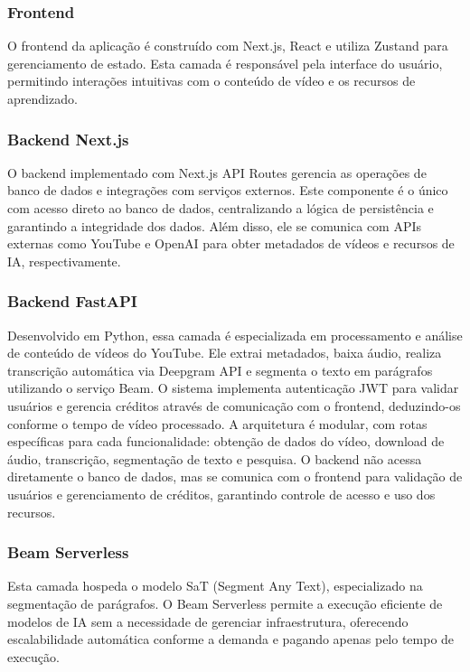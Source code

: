 \documentclass[tcc,capa]{texufpel}
\begin{document}
\subsubsection{Frontend}
O frontend da aplicação é construído com Next.js, React e utiliza Zustand para gerenciamento de estado. Esta camada é responsável pela interface do usuário, permitindo interações intuitivas com o conteúdo de vídeo e os recursos de aprendizado. 

\subsubsection{Backend Next.js}
O backend implementado com Next.js API Routes gerencia as operações de banco de dados e integrações com serviços externos. Este componente é o único com acesso direto ao banco de dados, centralizando a lógica de persistência e garantindo a integridade dos dados. Além disso, ele se comunica com APIs externas como YouTube e OpenAI para obter metadados de vídeos e recursos de IA, respectivamente.

\subsubsection{Backend FastAPI}
Desenvolvido em Python, essa camada é especializada em processamento e análise de conteúdo de vídeos do YouTube. Ele extrai metadados, baixa áudio, realiza transcrição automática via Deepgram API e segmenta o texto em parágrafos utilizando o serviço Beam. O sistema implementa autenticação JWT para validar usuários e gerencia créditos através de comunicação com o frontend, deduzindo-os conforme o tempo de vídeo processado.
A arquitetura é modular, com rotas específicas para cada funcionalidade: obtenção de dados do vídeo, download de áudio, transcrição, segmentação de texto e pesquisa. O backend não acessa diretamente o banco de dados, mas se comunica com o frontend para validação de usuários e gerenciamento de créditos, garantindo controle de acesso e uso dos recursos.

\subsubsection{Beam Serverless}
Esta camada hospeda o modelo SaT (Segment Any Text), especializado na segmentação de parágrafos. O Beam Serverless permite a execução eficiente de modelos de IA sem a necessidade de gerenciar infraestrutura, oferecendo escalabilidade automática conforme a demanda e pagando apenas pelo tempo de execução.
\end{document}
